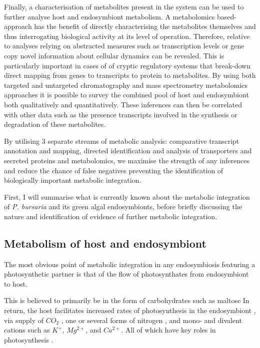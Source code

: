 Finally, a characterisation of metabolites present in the system can be used
to further analyse host and endosymbiont metabolism.  A metabolomics
based-approach has the benefit of directly characterising the metabolites
themselves and thus interrogating biological activity at its level of operation.
Therefore, relative to analyses relying on abstracted measures such as 
transcription levels or gene copy novel information about cellular dynamics
can be revealed. This is particularly important in cases of 
of cryptic regulatory systems that break-down direct mapping from genes to 
transcripts to protein to metabolites. 
By using both targeted and untargeted chromatography and mass
spectrometry metabolomics approaches it is possible to survey the combined
pool of host and endosymbiont both qualitatively and quantitatively. 
These inferences can then be correlated with other data such as the
presence transcripts involved in the synthesis or degradation of these metabolites. 

By utilising 3 separate streams of metabolic analysis: comparative transcript annotation
and mapping, directed identification and analysis of transporters and secreted
proteins and metabolomics, we maximise the strength of any inferences and 
reduce the chance of false negatives preventing the identification of biologically
important metabolic integration.

First, I will summarise what is currently known about the metabolic
integration of \textit{P. bursaria} and its green algal endosymbionts, before
briefly discussing the nature and identification of evidence of further metabolic
integration.

\subsection{Metabolism of host and endosymbiont}

The most obvious point of metabolic integration in any endosymbiosis
featuring a photosynthetic partner is that of the flow of photosynthates
from endosymbiont to host.

This is believed to primarily be in the form of carbohydrates such as maltose \citep{Muscatine1967}
In return, the host facilitates increased rates of photosynthesis in the endosymbiont \citep{Sommaruga2009},
via supply of \(CO_{2}\) \citep{Parker1926}, one or several forms of nitrogen \citep{Johnson2011},
and mono- and divalent cations such as \(K^{+}\), \(Mg^{2+}\), and \(Ca^{2+}\). 
All of which have key roles in photosynthesis \citep{Kato2009a}.

